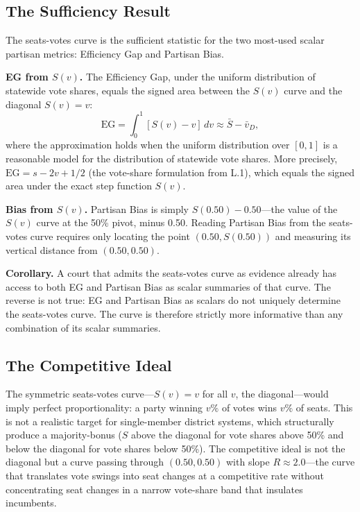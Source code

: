 \subsection{The Sufficiency Result}

The seats-votes curve is the sufficient statistic for the two most-used scalar
partisan metrics: Efficiency Gap and Partisan Bias.

\textbf{EG from $S(v)$.} The Efficiency Gap, under the uniform distribution
of statewide vote shares, equals the signed area between the $S(v)$ curve
and the diagonal $S(v) = v$:
\[
\text{EG} = \int_0^1 [S(v) - v]\, dv \approx \bar{S} - \bar{v}_D,
\]
where the approximation holds when the uniform distribution over $[0,1]$ is
a reasonable model for the distribution of statewide vote shares. More precisely,
$\text{EG} = s - 2v + 1/2$ (the vote-share formulation from L.1), which equals
the signed area under the exact step function $S(v)$.

\textbf{Bias from $S(v)$.} Partisan Bias is simply $S(0.50) - 0.50$---the
value of the $S(v)$ curve at the 50\% pivot, minus 0.50. Reading Partisan Bias
from the seats-votes curve requires only locating the point $(0.50, S(0.50))$
and measuring its vertical distance from $(0.50, 0.50)$.

\textbf{Corollary.} A court that admits the seats-votes curve as evidence
already has access to both EG and Partisan Bias as scalar summaries of that
curve. The reverse is not true: EG and Partisan Bias as scalars do not
uniquely determine the seats-votes curve. The curve is therefore strictly
more informative than any combination of its scalar summaries.

\subsection{The Competitive Ideal}

The symmetric seats-votes curve---$S(v) = v$ for all $v$, the diagonal---would
imply perfect proportionality: a party winning $v\%$ of votes wins $v\%$ of
seats. This is not a realistic target for single-member district systems, which
structurally produce a majority-bonus ($S$ above the diagonal for vote shares
above 50\% and below the diagonal for vote shares below 50\%). The competitive
ideal is not the diagonal but a curve passing through $(0.50, 0.50)$ with slope
$R \approx 2.0$---the curve that translates vote swings into seat changes at
a competitive rate without concentrating seat changes in a narrow vote-share band
that insulates incumbents.
